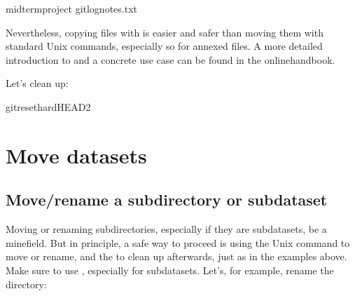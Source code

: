 \begin{sphinxVerbatim}[commandchars=\\\{\}]
midterm\PYGZus{}project
gitlognotes.txt

\end{sphinxVerbatim}

\sphinxAtStartPar
Nevertheless, copying files with  is easier and safer
than moving them with standard Unix commands, especially so for annexed files.
A more detailed introduction to  and a concrete
use case can be found in the online\sphinxhyphen{}handbook.

\sphinxAtStartPar
Let’s clean up:

\begin{sphinxVerbatim}[commandchars=\\\{\}]
gitreset\PYGZhy{}\PYGZhy{}hardHEAD\PYGZti{}2
\end{sphinxVerbatim}


\section{Move datasets}
\label{\detokenize{basics/101-136-filesystem:move-datasets}}
\ignorespaces 

\subsection{Move/rename a subdirectory or subdataset}
\label{\detokenize{basics/101-136-filesystem:move-rename-a-subdirectory-or-subdataset}}\label{\detokenize{basics/101-136-filesystem:index-10}}
\sphinxAtStartPar
Moving or renaming subdirectories, especially if they are subdatasets,
 be a minefield. But in principle, a safe way to proceed is using
the Unix  command to move or rename, and the 
to clean up afterwards, just as in the examples above. Make sure to
 use , especially for subdatasets.
Let’s, for example, rename the  directory:

